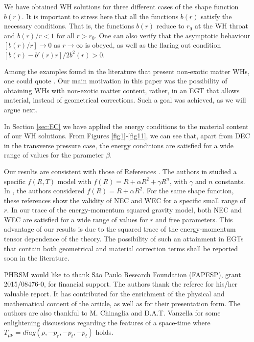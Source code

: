 \documentclass[twocolumn,showpacs,aps,amssymb,floatfix,prd,amsmath,preprintnumbers]{revtex4}
\begin{document}
We have obtained WH solutions for three different cases of the shape function $b(r)$. It is important to stress here that all the functions $b(r)$ satisfy the necessary conditions. That is, the functions $b(r)$ reduce to $r_0$ at the WH throat and $b(r)/r<1$ for all $r>r_0$. One can also verify that the asymptotic behaviour $[b(r)/r]\rightarrow0$ as $r\rightarrow\infty$ is obeyed, as well as the flaring out condition $[b(r)-b'(r)r]/2b^{2}(r)>0$.

Among the examples found in the literature that present non-exotic matter WHs, one could quote \cite{hohmann/2014,maeda/2008}. Our main motivation in this paper was the possibility of obtaining WHs with non-exotic matter content, rather, in an EGT that allows material, instead of geometrical corrections. Such a goal was achieved, as we will argue next. 

In Section \ref{sec:EC} we have applied the energy conditions to the material content of our WH solutions. From Figures \ref{fig1}-\ref{fig11}, we can see that, apart from DEC in the transverse pressure case, the energy conditions are satisfied for a wide range of values for the parameter $\beta$.

Our results are consistent with those of References \cite{zubair/2016,Yousaf/2017}. The authors in \cite{zubair/2016} studied a specific $f(R,T)$ model with $f(R)=R+\alpha R^2+\gamma R^n$, with $\gamma$ and $n$ constants. In \cite{Yousaf/2017}, the authors considered $f(R)=R+\alpha R^2$. For the same shape function, these references show the validity of NEC and WEC for a specific small range of $r$. In our trace of the energy-momentum squared gravity model, both NEC and WEC are satisfied for a wide range of values for $r$ and free parameters. This advantage of our results is due to the squared trace of the energy-momentum tensor dependence of the theory. The possibility of such an attainment in EGTs that contain both geometrical and material correction terms shall be reported soon in the literature.

\acknowledgments PHRSM would like to thank S\~ao Paulo Research Foundation (FAPESP), grant 2015/08476-0, for financial support. The authors thank the referee for his/her valuable report. It has contributed for the enrichment of the physical and mathematical content of the article, as well as for their presentation form. The authors are also thankful to M. Chinaglia and D.A.T. Vanzella for some enlightening discussions regarding the features of a space-time where $T_{\mu\nu}=diag(\rho,-p_r,-p_t,-p_t)$ holds.
\end{document}
